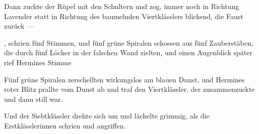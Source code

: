 Dann zuckte der Rüpel mit den Schultern und zog, immer noch in Richtung Lavender statt in Richtung des baumelnden Viertklässlers blickend, die Faust zurück —

, schrien fünf Stimmen, und fünf grüne Spiralen schossen aus fünf Zauberstäben, die durch fünf Löcher in der falschen Wand zielten, und einen Augenblick später rief Hermines Stimme 

Fünf grüne Spiralen zerschellten wirkungslos am blauen Dunst, und Hermines roter Blitz prallte vom Dunst ab und traf den Viertklässler, der zusammenzuckte und dann still war.

Und der Siebtklässler drehte sich um und lächelte grimmig, als die Erstklässlerinnen schrien und angriffen.

\later

